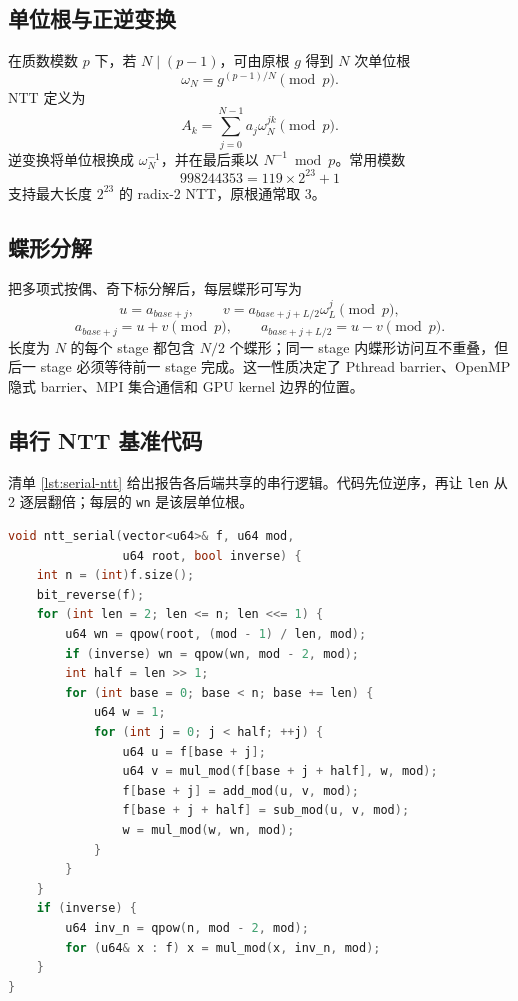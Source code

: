 \subsection{单位根与正逆变换}

在质数模数 $p$ 下，若 $N\mid(p-1)$，可由原根 $g$ 得到 $N$ 次单位根
\[
\omega_N=g^{(p-1)/N}\pmod p.
\]
NTT 定义为
\[
A_k=\sum_{j=0}^{N-1}a_j\omega_N^{jk}\pmod p.
\]
逆变换将单位根换成 $\omega_N^{-1}$，并在最后乘以 $N^{-1}\bmod p$。常用模数
\[
998244353=119\times2^{23}+1
\]
支持最大长度 $2^{23}$ 的 radix-2 NTT，原根通常取 $3$。

\subsection{蝶形分解}

把多项式按偶、奇下标分解后，每层蝶形可写为
\[
u=a_{base+j},\qquad
v=a_{base+j+L/2}\omega_L^j\pmod p,
\]
\[
a_{base+j}=u+v\pmod p,
\qquad
a_{base+j+L/2}=u-v\pmod p.
\]
长度为 $N$ 的每个 stage 都包含 $N/2$ 个蝶形；同一 stage 内蝶形访问互不重叠，但后一 stage 必须等待前一 stage 完成。这一性质决定了 Pthread barrier、OpenMP 隐式 barrier、MPI 集合通信和 GPU kernel 边界的位置。

\subsection{串行 NTT 基准代码}

清单 \ref{lst:serial-ntt} 给出报告各后端共享的串行逻辑。代码先位逆序，再让 \texttt{len} 从 2 逐层翻倍；每层的 \texttt{wn} 是该层单位根。

\begin{lstlisting}[title=串行迭代 NTT 核心,label={lst:serial-ntt},language={C++}]
void ntt_serial(vector<u64>& f, u64 mod,
                u64 root, bool inverse) {
    int n = (int)f.size();
    bit_reverse(f);
    for (int len = 2; len <= n; len <<= 1) {
        u64 wn = qpow(root, (mod - 1) / len, mod);
        if (inverse) wn = qpow(wn, mod - 2, mod);
        int half = len >> 1;
        for (int base = 0; base < n; base += len) {
            u64 w = 1;
            for (int j = 0; j < half; ++j) {
                u64 u = f[base + j];
                u64 v = mul_mod(f[base + j + half], w, mod);
                f[base + j] = add_mod(u, v, mod);
                f[base + j + half] = sub_mod(u, v, mod);
                w = mul_mod(w, wn, mod);
            }
        }
    }
    if (inverse) {
        u64 inv_n = qpow(n, mod - 2, mod);
        for (u64& x : f) x = mul_mod(x, inv_n, mod);
    }
}
\end{lstlisting}

